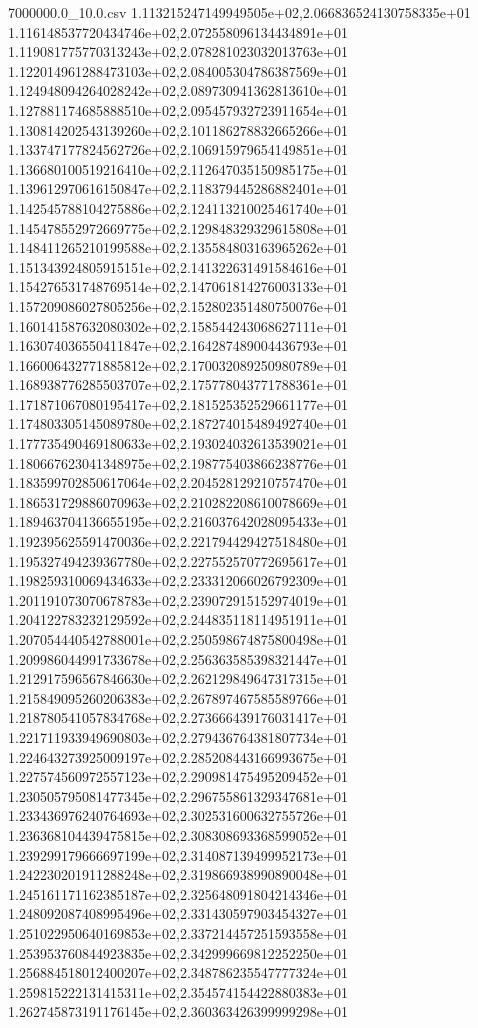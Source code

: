 \begin{filecontents*}{7000000.0_10.0.csv}
1.113215247149949505e+02,2.066836524130758335e+01
1.116148537720434746e+02,2.072558096134434891e+01
1.119081775770313243e+02,2.078281023032013763e+01
1.122014961288473103e+02,2.084005304786387569e+01
1.124948094264028242e+02,2.089730941362813610e+01
1.127881174685888510e+02,2.095457932723911654e+01
1.130814202543139260e+02,2.101186278832665266e+01
1.133747177824562726e+02,2.106915979654149851e+01
1.136680100519216410e+02,2.112647035150985175e+01
1.139612970616150847e+02,2.118379445286882401e+01
1.142545788104275886e+02,2.124113210025461740e+01
1.145478552972669775e+02,2.129848329329615808e+01
1.148411265210199588e+02,2.135584803163965262e+01
1.151343924805915151e+02,2.141322631491584616e+01
1.154276531748769514e+02,2.147061814276003133e+01
1.157209086027805256e+02,2.152802351480750076e+01
1.160141587632080302e+02,2.158544243068627111e+01
1.163074036550411847e+02,2.164287489004436793e+01
1.166006432771885812e+02,2.170032089250980789e+01
1.168938776285503707e+02,2.175778043771788361e+01
1.171871067080195417e+02,2.181525352529661177e+01
1.174803305145089780e+02,2.187274015489492740e+01
1.177735490469180633e+02,2.193024032613539021e+01
1.180667623041348975e+02,2.198775403866238776e+01
1.183599702850617064e+02,2.204528129210757470e+01
1.186531729886070963e+02,2.210282208610078669e+01
1.189463704136655195e+02,2.216037642028095433e+01
1.192395625591470036e+02,2.221794429427518480e+01
1.195327494239367780e+02,2.227552570772695617e+01
1.198259310069434633e+02,2.233312066026792309e+01
1.201191073070678783e+02,2.239072915152974019e+01
1.204122783232129592e+02,2.244835118114951911e+01
1.207054440542788001e+02,2.250598674875800498e+01
1.209986044991733678e+02,2.256363585398321447e+01
1.212917596567846630e+02,2.262129849647317315e+01
1.215849095260206383e+02,2.267897467585589766e+01
1.218780541057834768e+02,2.273666439176031417e+01
1.221711933949690803e+02,2.279436764381807734e+01
1.224643273925009197e+02,2.285208443166993675e+01
1.227574560972557123e+02,2.290981475495209452e+01
1.230505795081477345e+02,2.296755861329347681e+01
1.233436976240764693e+02,2.302531600632755726e+01
1.236368104439475815e+02,2.308308693368599052e+01
1.239299179666697199e+02,2.314087139499952173e+01
1.242230201911288248e+02,2.319866938990890048e+01
1.245161171162385187e+02,2.325648091804214346e+01
1.248092087408995496e+02,2.331430597903454327e+01
1.251022950640169853e+02,2.337214457251593558e+01
1.253953760844923835e+02,2.342999669812252250e+01
1.256884518012400207e+02,2.348786235547777324e+01
1.259815222131415311e+02,2.354574154422880383e+01
1.262745873191176145e+02,2.360363426399999298e+01

\end{filecontents*}
